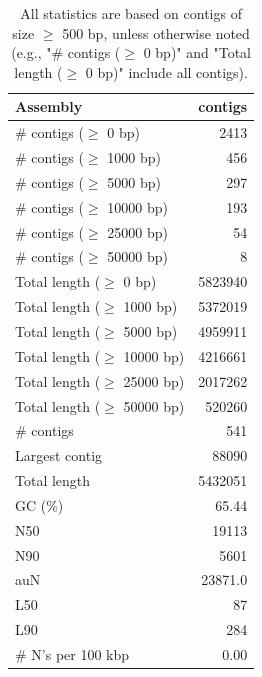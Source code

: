 \documentclass[12pt,a4paper]{article}
\begin{document}
\begin{table}[ht]
\begin{center}
\caption{All statistics are based on contigs of size $\geq$ 500 bp, unless otherwise noted (e.g., "\# contigs ($\geq$ 0 bp)" and "Total length ($\geq$ 0 bp)" include all contigs).}
\begin{tabular}{|l*{1}{|r}|}
\hline
Assembly & contigs \\ \hline
\# contigs ($\geq$ 0 bp) & 2413 \\ \hline
\# contigs ($\geq$ 1000 bp) & 456 \\ \hline
\# contigs ($\geq$ 5000 bp) & 297 \\ \hline
\# contigs ($\geq$ 10000 bp) & 193 \\ \hline
\# contigs ($\geq$ 25000 bp) & 54 \\ \hline
\# contigs ($\geq$ 50000 bp) & 8 \\ \hline
Total length ($\geq$ 0 bp) & 5823940 \\ \hline
Total length ($\geq$ 1000 bp) & 5372019 \\ \hline
Total length ($\geq$ 5000 bp) & 4959911 \\ \hline
Total length ($\geq$ 10000 bp) & 4216661 \\ \hline
Total length ($\geq$ 25000 bp) & 2017262 \\ \hline
Total length ($\geq$ 50000 bp) & 520260 \\ \hline
\# contigs & 541 \\ \hline
Largest contig & 88090 \\ \hline
Total length & 5432051 \\ \hline
GC (\%) & 65.44 \\ \hline
N50 & 19113 \\ \hline
N90 & 5601 \\ \hline
auN & 23871.0 \\ \hline
L50 & 87 \\ \hline
L90 & 284 \\ \hline
\# N's per 100 kbp & 0.00 \\ \hline
\end{tabular}
\end{center}
\end{table}
\end{document}
